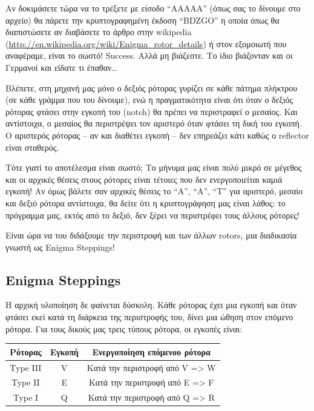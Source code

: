 \documentclass[a4paper,twoside,12pt]{article}
\begin{document}
Αν δοκιμάσετε τώρα να το τρέξετε με είσοδο “ΑΑΑΑΑ” (όπως σας το δίνουμε στο αρχείο) θα πάρετε την κρυπτογραφημένη έκδοση “BDZGO” η οποία όπως θα διαπιστώσετε αν διαβάσετε το άρθρο στην wikipedia (\url{http://en.wikipedia.org/wiki/Enigma_rotor_details}) ή στον εξομοιωτή που αναφέραμε, είναι το σωστό! Success. Αλλά μη βιάζεστε. Το ίδιο βιάζονταν και οι Γερμανοί και είδατε τι έπαθαν\ldots

Βλέπετε, στη μηχανή μας μόνο ο δεξιός ρότορας γυρίζει σε κάθε πάτημα πλήκτρου (σε κάθε γράμμα που του δίνουμε), ενώ η πραγματικότητα είναι ότι όταν ο δεξιός ρότορας φτάσει στην εγκοπή του (notch) θα πρέπει να περιστραφεί ο μεσαίος. Και αντίστοιχα, ο μεσαίος θα περιστρέψει τον αριστερό όταν φτάσει τη δική του εγκοπή. Ο αριστερός ρότορας – αν και διαθέτει εγκοπή – δεν επηρεάζει κάτι καθώς ο reflector είναι σταθερός.

Τότε γιατί το αποτέλεσμα είναι σωστό; Το μήνυμα μας είναι πολύ μικρό σε μέγεθος και οι αρχικές θέσεις στους ρότορες είναι τέτοιες που δεν ενεργοποιείται καμιά εγκοπή! Αν όμως βάλετε σαν αρχικές θέσεις το “Α”, “Α”, “Τ” για αριστερό, μεσαίο και δεξιό ρότορα αντίστοιχα, θα δείτε ότι η κρυπτογράφηση μας είναι λάθος: το πρόγραμμα μας, εκτός από το δεξιό, δεν ξέρει να περιστρέφει τους άλλους ρότορες!

Είναι ώρα να του διδάξουμε την περιστροφή και των άλλων rotors, μια διαδικασία γνωστή ως Enigma Steppings!

\subsection{Enigma Steppings}

Η αρχική υλοποίηση δε φαίνεται δύσκολη. Κάθε ρότορας έχει μια εγκοπή και όταν φτάσει εκεί κατά τη διάρκεια της περιστροφής του, δίνει μια ώθηση στον επόμενο ρότορα. Για τους δικούς μας τρεις τύπους ρότορα, οι εγκοπές είναι:

\begin{center}
\begin{tabular}{|c|c|c|}
\hline
\textbf{Ρότορας}&\textbf{Εγκοπή}&\textbf{Ενεργοποίηση επόμενου ρότορα}\\
\hline
Type III&V&Κατά την περιστροφή από V => W\\
\hline
Type II&E&Κατά την περιστροφή από Ε => F\\
\hline
Type I&Q&Κατά την περιστροφή από Q => R\\
\hline
\end{tabular}
\end{center}
\end{document}
